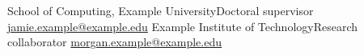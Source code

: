   {School of Computing, Example University}{Doctoral supervisor}{
  \href{mailto:jamie.example@example.edu}{jamie.example@example.edu}
}
  {Example Institute of Technology}{Research collaborator}{
  \href{mailto:morgan.example@example.edu}{morgan.example@example.edu}
}
